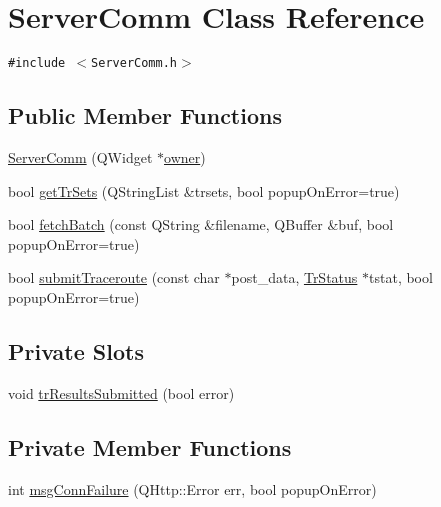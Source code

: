 \hypertarget{classServerComm}{
\section{ServerComm Class Reference}
\label{classServerComm}
}
{\tt \#include $<$ServerComm.h$>$}

\subsection*{Public Member Functions}
\begin{CompactItemize}
\item 
\hyperlink{classServerComm_a8fadc823665d05f8c7d9f577e2c02d8}{ServerComm} (QWidget $\ast$\hyperlink{classServerComm_b54032885f5525793add53721382471e}{owner})
\item 
bool \hyperlink{classServerComm_b93e71f0a8ce1f2eaf18c331a3112722}{getTrSets} (QStringList \&trsets, bool popupOnError=true)
\item 
bool \hyperlink{classServerComm_b3918ae914534b6df5566c5ddb7059cf}{fetchBatch} (const QString \&filename, QBuffer \&buf, bool popupOnError=true)
\item 
bool \hyperlink{classServerComm_b7e0486d46e28e2bf8847e770916d98d}{submitTraceroute} (const char $\ast$post\_\-data, \hyperlink{classTrStatus}{TrStatus} $\ast$tstat, bool popupOnError=true)
\end{CompactItemize}
\subsection*{Private Slots}
\begin{CompactItemize}
\item 
void \hyperlink{classServerComm_d1099a80e50d54d10f9d45988c5a6b6b}{trResultsSubmitted} (bool error)
\end{CompactItemize}
\subsection*{Private Member Functions}
\begin{CompactItemize}
\item 
int \hyperlink{classServerComm_90d964e211713d3b299dabd61708a294}{msgConnFailure} (QHttp::Error err, bool popupOnError)
\end{CompactItemize}
